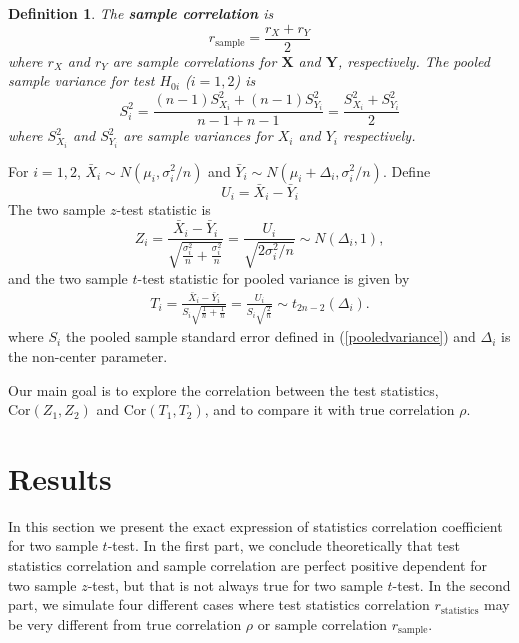 \documentclass[11pt, a4paper]{article}
\newtheorem{definition}{Definition}     %
\begin{document}
\begin{definition}
	The \textbf{sample correlation} is 
	\begin{equation}\label{rhosample}
		r_{\text{sample}}  = \frac{r_X + r_Y}{2}
	\end{equation}
	where $r_X$  and $r_Y$ are sample correlations for $\bm X$ and $\bm Y$, respectively.
		The pooled sample variance for test $H_{0i}$ ($i=1, 2$) is 
	\begin{equation}\label{pooledvariance}
		S_i^2 = \frac{(n-1)S_{X_i}^2 + (n-1)S_{Y_i}^2}{n-1 + n-1} = \frac{S_{X_i}^2 + S_{Y_i}^2}{2}
	\end{equation}
	where $S_{X_i}^2$ and $S_{Y_i}^2$ are sample variances for $X_i$ and $Y_i$ respectively.
\end{definition} 


For $i =1, 2$,  $\bar{X}_{i}\sim N(\mu_i, \sigma_i^2/n)$ and $\bar{Y}_{i}\sim N(\mu_i + \Delta_i, \sigma_i^2/n)$. Define
\begin{equation}\label{expreU}
U_i = \bar{X}_i - \bar{Y}_i
\end{equation}
The two sample $z$-test statistic is
\begin{equation}\label{zTest}
Z_i = \frac{\bar{X}_{i}-\bar{Y}_{i} }{\sqrt{\frac{\sigma^2_i}{n} + \frac{\sigma^2_i}{n}}} = \frac{U_i}{\sqrt{2\sigma_i^2/n}}\sim N(\Delta_i, 1) ,
\end{equation}
and the two sample $t$-test statistic for pooled variance is given by
\begin{align}\label{t-test}
T_i = \frac{\bar{X}_i - \bar{Y}_i}{S_i\sqrt{\frac{1}{n}+\frac{1}{n}}} = \frac{U_i}{S_i\sqrt{\frac{2}{n}}} \sim t_{2n-2}(\Delta_i). 
\end{align}
where $S_i$ the pooled sample standard error defined in (\ref{pooledvariance}) and $\Delta_i$ is the non-center parameter. 

Our main goal is to explore the correlation between the test statistics, $\text{Cor}({Z_1, Z_2})$ and $\text{Cor}({T_1, T_2})$, and to compare it with true correlation $\rho$. 



\section{Results}

 In this section we present the exact expression of statistics correlation coefficient for two sample $t$-test. In the first part, we conclude theoretically that test statistics correlation and sample correlation are perfect positive dependent for two sample $z$-test, but that is not always true for two sample $t$-test. In the second part, we simulate four different cases where test statistics correlation $r_{\text{statistics}}$ may be very different from true correlation $\rho$ or sample correlation $r_{\text{sample}}$. 
\end{document}
